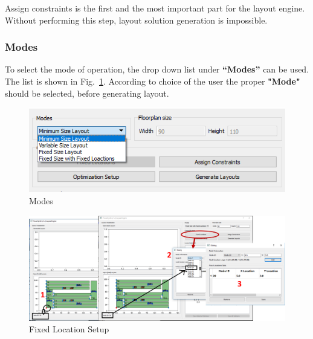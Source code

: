 \documentclass[11pt]{article}
\begin{document}
Assign constraints is the first and the most important part for the layout engine. Without performing this step, layout solution generation is impossible.

\subsubsection{Modes}
\label{sec-2-6-3}
 To select the mode of operation, the drop down list under \textbf{“Modes”} can be used. The list is shown in Fig.~\ref{modes}. According to choice of the user the proper \textbf{"Mode"} should be selected, before generating layout.
\begin{figure}[t]
\centering
\includegraphics[scale=1]{./figs//modes.PNG}
\caption{Modes}
\label{modes}
\end{figure}

\begin{figure}[t]
\centering
\includegraphics[width=1\textwidth]{./figs/Fixed_loc.png}
\caption{Fixed Location Setup}
\label{fix_loc}
\end{figure}
\end{document}
